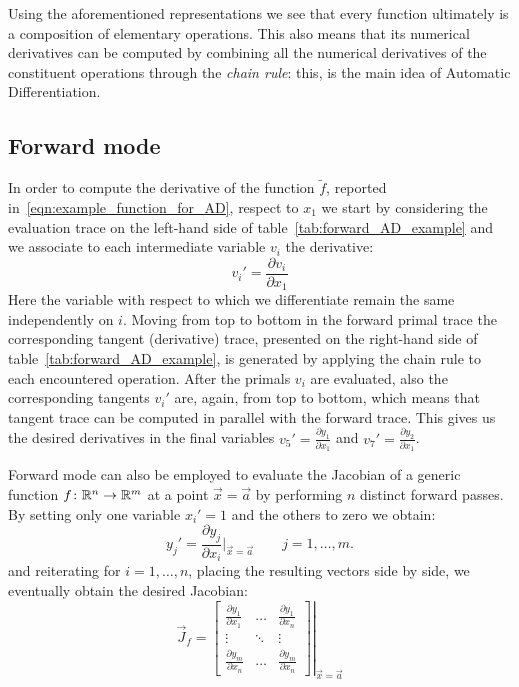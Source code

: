 Using the aforementioned representations we see that every function ultimately is a composition of elementary operations. This also means that its numerical derivatives can be computed by combining all the numerical derivatives of the constituent operations through the \emph{chain rule}: this, is the main idea of Automatic Differentiation.



\subsection{Forward mode}
\label{subsec:forward_mode_AD}

In order to compute the derivative of the function $\tilde{f}$, reported in~\eqref{eqn:example_function_for_AD}, respect to $x_1$ we start by considering the evaluation trace on the left-hand side of table~\ref{tab:forward_AD_example} and we associate to each intermediate variable $ v_i$ the derivative:
\[
	v_i' = \frac{\partial v_i}{\partial x_1}
\]
Here the variable with respect to which we differentiate remain the same independently on $i$.
Moving from top to bottom in the forward primal trace the corresponding tangent (derivative) trace, presented on the right-hand side of table~\ref{tab:forward_AD_example}, is generated by applying the chain rule to each encountered operation. After the primals $v_i$ are evaluated, also the corresponding tangents $v_i'$ are, again, from top to bottom, which means that tangent trace can be computed in parallel with the forward trace. This gives us the desired derivatives in the final variables $v_5' = \frac{\partial y_1}{\partial x_1}$ and $v_7' = \frac{\partial y_2}{\partial x_1}$.

\medskip
Forward mode can also be employed to evaluate the Jacobian of a generic function $f \colon \mathbb{R}^n \to \mathbb{R}^m$ at a point $\vec{x} = \vec{a}$ by performing $n$ distinct forward passes. By setting only one variable $x_i'=1$ and the others to zero we obtain:
\[
	y_j' = \frac{\partial y_j}{\partial x_i}\bigg|_{\vec{x}=\vec{a}} \qquad j=1,\dots,m.
\]
and reiterating for $i=1,\dots,n$, placing the resulting vectors side by side, we eventually obtain the desired Jacobian:
\[
\vec{J}_f =
\left.
\begin{bmatrix}
	\frac{\partial y_1}{\partial x_1} &  \dots  & \frac{\partial y_1}{\partial x_n}  \\
	\vdots							  & \ddots  & \vdots							 \\
	\frac{\partial y_m}{\partial x_n} &  \dots  & \frac{\partial y_m}{\partial x_n}
\end{bmatrix}
\right|_{\vec{x} = \vec{a}}
\]

